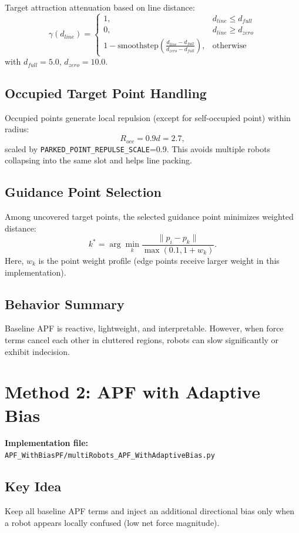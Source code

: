 \documentclass[11pt,a4paper]{article}
\begin{document}
Target attraction attenuation based on line distance:
\begin{equation}
\gamma(d_{line})=
\begin{cases}
1, & d_{line}\le d_{full} \\
0, & d_{line}\ge d_{zero} \\
1-\mathrm{smoothstep}\!\left(\frac{d_{line}-d_{full}}{d_{zero}-d_{full}}\right), & \text{otherwise}
\end{cases}
\end{equation}
with $d_{full}=5.0$, $d_{zero}=10.0$.

\subsection{Occupied Target Point Handling}
Occupied points generate local repulsion (except for self-occupied point) within radius:
\begin{equation}
    R_{occ}=0.9d=2.7,
\end{equation}
scaled by \texttt{PARKED\_POINT\_REPULSE\_SCALE}=0.9.
This avoids multiple robots collapsing into the same slot and helps line packing.

\subsection{Guidance Point Selection}
Among uncovered target points, the selected guidance point minimizes weighted distance:
\begin{equation}
    k^*=\arg\min_k \frac{\|p_i-p_k\|}{\max(0.1,1+w_k)}.
\end{equation}
Here, $w_k$ is the point weight profile (edge points receive larger weight in this implementation).

\subsection{Behavior Summary}
Baseline APF is reactive, lightweight, and interpretable. However, when force terms cancel each other in cluttered regions, robots can slow significantly or exhibit indecision.

\section{Method 2: APF with Adaptive Bias}
\textbf{Implementation file:} \texttt{APF\_WithBiasPF/multiRobots\_APF\_WithAdaptiveBias.py}

\subsection{Key Idea}
Keep all baseline APF terms and inject an additional directional bias only when a robot appears locally confused (low net force magnitude).
\end{document}
